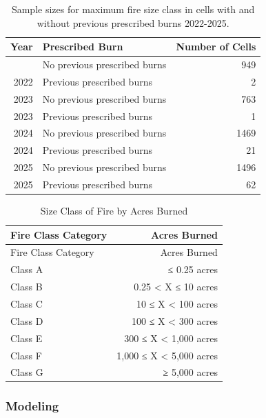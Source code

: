 \documentclass[
  letterpaper,
  DIV=11,
  numbers=noendperiod]{scrartcl}
\begin{document}
{

\begin{longtable}[]{@{}rlr@{}}

\caption{\label{tbl-rx-size-class-annual}Sample sizes for maximum fire
size class in cells with and without previous prescribed burns
2022-2025.}

\tabularnewline

\toprule\noalign{}
Year & Prescribed Burn & Number of Cells \\
\midrule\noalign{}
\endhead
\bottomrule\noalign{}
\endlastfoot
2022 & No previous prescribed burns & 949 \\
2022 & Previous prescribed burns & 2 \\
2023 & No previous prescribed burns & 763 \\
2023 & Previous prescribed burns & 1 \\
2024 & No previous prescribed burns & 1469 \\
2024 & Previous prescribed burns & 21 \\
2025 & No previous prescribed burns & 1496 \\
2025 & Previous prescribed burns & 62 \\

\end{longtable}

}

\begin{longtable}[]{@{}lr@{}}
\caption{Size Class of Fire by Acres
Burned}\label{tbl-size-class}\tabularnewline
\toprule\noalign{}
Fire Class Category & Acres Burned \\
\midrule\noalign{}
\endfirsthead
\toprule\noalign{}
Fire Class Category & Acres Burned \\
\midrule\noalign{}
\endhead
\bottomrule\noalign{}
\endlastfoot
Class A & ≤ 0.25 acres \\
Class B & 0.25 \textless{} X ≤ 10 acres \\
Class C & 10 ≤ X \textless{} 100 acres \\
Class D & 100 ≤ X \textless{} 300 acres \\
Class E & 300 ≤ X \textless{} 1,000 acres \\
Class F & 1,000 ≤ X \textless{} 5,000 acres \\
Class G & ≥ 5,000 acres \\
\end{longtable}

\subsubsection{Modeling}\label{modeling}
\end{document}
